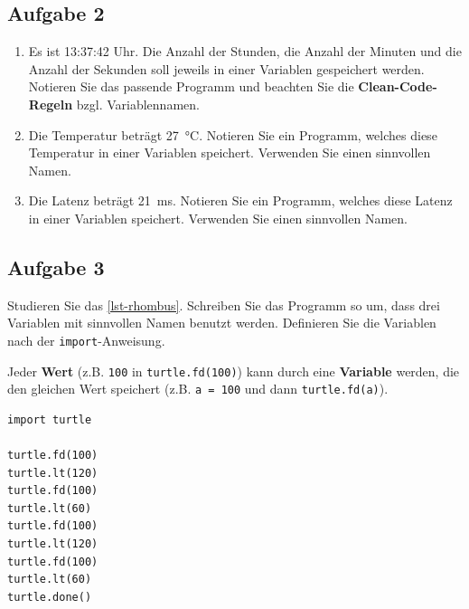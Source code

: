\subsection{Aufgabe 2}

\begin{enumerate}

\item Es ist 13:37:42 Uhr. Die Anzahl der Stunden, die Anzahl der Minuten und die Anzahl der Sekunden soll jeweils in einer Variablen gespeichert werden. Notieren Sie das passende Programm und beachten Sie die \textbf{Clean-Code-Regeln} bzgl. Variablennamen.
\fillwithgrid{0.75in}

\item Die Temperatur beträgt \qty{27}{\degreeCelsius}. Notieren Sie ein Programm, welches diese Temperatur in einer Variablen speichert. Verwenden Sie einen sinnvollen Namen.
\fillwithgrid{0.25in}

\item Die Latenz beträgt \qty{21}{\ms}. Notieren Sie ein Programm, welches diese Latenz in einer Variablen speichert. Verwenden Sie einen sinnvollen Namen.
\fillwithgrid{0.25in}

\end{enumerate}

\subsection{Aufgabe 3}

Studieren Sie das \autoref{lst-rhombus}. Schreiben Sie das Programm so um, dass drei Variablen mit sinnvollen Namen benutzt werden. Definieren Sie die Variablen nach der \lstinline{import}-Anweisung.

\begin{important}
Jeder \textbf{Wert} (z.B. \lstinline{100} in \lstinline{turtle.fd(100)}) kann durch eine \textbf{Variable}  werden, die den gleichen Wert speichert (z.B. \lstinline{a = 100} und dann \lstinline{turtle.fd(a)}).
\end{important}

\begin{minipage}{0.35\textwidth}
\centering
\begin{lstlisting}[caption={Ein Rhombus.}, label={lst-rhombus}]
import turtle

turtle.fd(100)
turtle.lt(120)
turtle.fd(100)
turtle.lt(60)
turtle.fd(100)
turtle.lt(120)
turtle.fd(100)
turtle.lt(60)
turtle.done()
\end{lstlisting}
\end{minipage}
\hfill
\begin{minipage}{0.55\textwidth}
\centering
\fillwithgrid{2.75in}
\end{minipage}